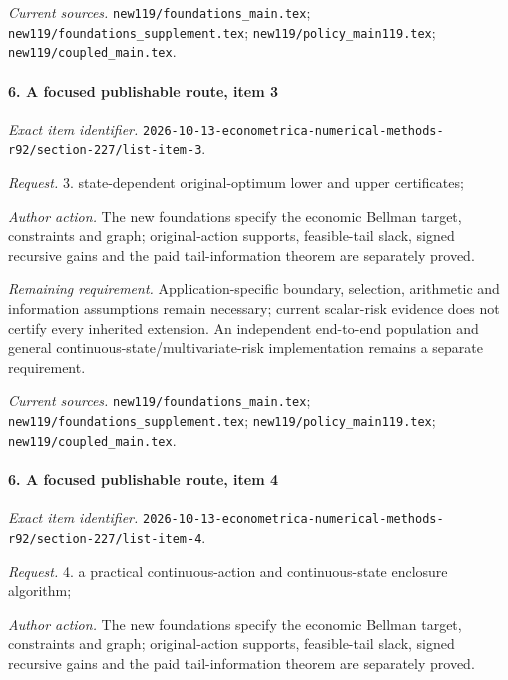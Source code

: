 \par\emph{Current sources.} \nolinkurl{new119/foundations_main.tex}; \nolinkurl{new119/foundations_supplement.tex}; \nolinkurl{new119/policy_main119.tex}; \nolinkurl{new119/coupled_main.tex}.

\paragraph{6. A focused publishable route, item 3}

\emph{Exact item identifier.} \nolinkurl{2026-10-13-econometrica-numerical-methods-r92/section-227/list-item-3}.

\par\emph{Request.} 3. state-dependent original-optimum lower and upper certificates;

\par\emph{Author action.} The new foundations specify the economic Bellman target, constraints and graph; original-action supports, feasible-tail slack, signed recursive gains and the paid tail-information theorem are separately proved.

\par\emph{Remaining requirement.} Application-specific boundary, selection, arithmetic and information assumptions remain necessary; current scalar-risk evidence does not certify every inherited extension. An independent end-to-end population and general continuous-state/\allowbreak{}multivariate-risk implementation remains a separate requirement.

\par\emph{Current sources.} \nolinkurl{new119/foundations_main.tex}; \nolinkurl{new119/foundations_supplement.tex}; \nolinkurl{new119/policy_main119.tex}; \nolinkurl{new119/coupled_main.tex}.

\paragraph{6. A focused publishable route, item 4}

\emph{Exact item identifier.} \nolinkurl{2026-10-13-econometrica-numerical-methods-r92/section-227/list-item-4}.

\par\emph{Request.} 4. a practical continuous-action and continuous-state enclosure algorithm;

\par\emph{Author action.} The new foundations specify the economic Bellman target, constraints and graph; original-action supports, feasible-tail slack, signed recursive gains and the paid tail-information theorem are separately proved.

